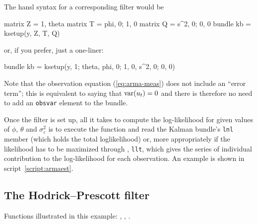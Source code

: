 The \textsf{hansl} syntax for a corresponding filter would be
\begin{code}
matrix Z = {1, theta}
matrix T = {phi, 0; 1, 0}
matrix Q = {s^2, 0; 0, 0}
bundle kb = ksetup(y, Z, T, Q)
\end{code}
%
or, if you prefer, just a one-liner:
\begin{code}
bundle kb = ksetup(y, {1; theta}, {phi, 0; 1, 0}, {s^2, 0; 0, 0})
\end{code}

Note that the observation equation (\ref{eq:arma-meas}) does not
include an ``error term''; this is equivalent to saying that
$\mbox{var}(u_t) = 0$ and there is therefore no need to add
an \texttt{obsvar} element to the bundle.

Once the filter is set up, all it takes to compute the log-likelihood
for given values of $\phi$, $\theta$ and $\sigma^2_{\varepsilon}$ is
to execute the  function and read the Kalman
bundle's \texttt{lnl} member (which holds the total loglikelihood)
or, more appropriately if the likelihood has to be maximized through
, \texttt{llt}, which gives the series of individual
contribution to the log-likelihood for each observation. An example is
shown in script~\ref{script:armaest}.

\subsection{The Hodrick--Prescott filter}
\label{sec:example_hp}

Functions illustrated in this example: , ,
.

